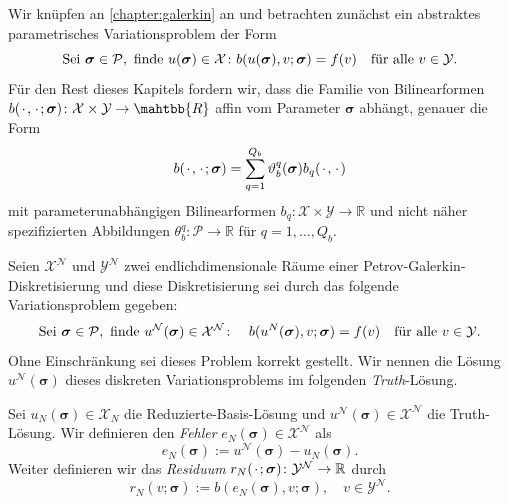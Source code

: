 \documentclass[../main.tex]{subfiles}
\begin{document}
Wir knüpfen an \cref{chapter:galerkin} an und betrachten zunächst ein abstraktes parametrisches Variationsproblem der Form
\begin{equation}
    \text{Sei } \bm \sigma \in \mathcal P, \text{ finde } u(\bm \sigma) \in \mathcal X \colon b(u(\bm \sigma), v; \bm \sigma) = f(v) \quad \fa v \in \mathcal Y.
\end{equation}
Für den Rest dieses Kapitels fordern wir, dass die Familie von Bilinearformen $b(\blank, \blank; \bm \sigma) \colon \mathcal X \times \mathcal Y \to \mahtbb{R}$ affin vom Parameter $\bm \sigma$ abhängt, genauer die Form
\begin{equation}
     b(\blank, \blank; \bm \sigma) = \sum_{q = 1}^{Q_b} \theta_{b}^{q}(\bm \sigma) b_{q}(\blank, \blank)
 \end{equation}
 mit parameterunabhängigen Bilinearformen $b_{q} \colon \mathcal X \times \mathcal Y \to \mathbb{R}$ und nicht näher spezifizierten Abbildungen $\theta_{b}^{q} \colon \mathcal P \to \mathbb{R}$ für $q = 1, \dots, Q_{b}$.

\begin{Definition}
    Seien $\mathcal X^{\mathcal N}$ und $\mathcal Y^{\mathcal N}$ zwei endlichdimensionale Räume einer Petrov-Galerkin-Diskretisierung und diese Diskretisierung sei durch das folgende Variationsproblem gegeben:
    \begin{equation}
        \text{Sei } \bm \sigma \in \mathcal P, \text{ finde } u^{\mathcal N}(\bm \sigma) \in \mathcal X^{\mathcal N} \colon \quad b(u^{N}(\bm \sigma), v; \bm \sigma) = f(v) \quad \fa v \in \mathcal Y.
    \end{equation}
    Ohne Einschränkung sei dieses Problem korrekt gestellt.
    Wir nennen die Lösung $u^{\mathcal N}(\bm \sigma)$ dieses diskreten Variationsproblems im folgenden \emph{Truth}-Lösung.
\end{Definition}

\begin{Definition}
    Sei $u_{N}(\bm \sigma) \in \mathcal X_{N}$ die Reduzierte-Basis-Lösung und $u^{\mathcal N}(\bm \sigma) \in \mathcal X^{\mathcal N}$ die Truth-Lösung.
    Wir definieren den \emph{Fehler} $e_{N}(\bm \sigma) \in \mathcal X^{\mathcal N}$ als
    \begin{equation}
        e_{N}(\bm \sigma) := u^{\mathcal N}(\bm \sigma) - u_{N}(\bm \sigma).
    \end{equation}
    Weiter definieren wir das \emph{Residuum} $r_{N}(\blank; \bm \sigma) \colon \mathcal Y^{\mathcal N} \to \mathbb{R}$ durch
    \begin{equation}
    \label{eq:variationsproblem_residuum}
        r_{N}(v; \bm \sigma) := b(e_{N}(\bm \sigma), v; \bm \sigma), \quad v \in \mathcal Y^{\mathcal N}.
    \end{equation}
\end{Definition}
\end{document}
